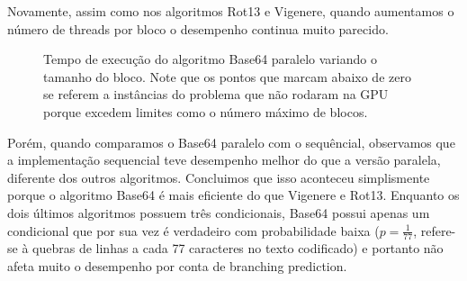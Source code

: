 \documentclass[12pt]{article}
\begin{document}
Novamente, assim como nos algoritmos Rot13 e Vigenere, quando aumentamos
o número de threads por bloco o desempenho continua muito parecido.

\begin{figure}[H]
    \caption{Tempo de execução do algoritmo Base64 paralelo variando o
    tamanho do bloco. Note que os pontos que marcam abaixo de zero se
    referem a instâncias do problema que não rodaram na GPU porque 
    excedem limites como o número máximo de blocos.}
\end{figure}

Porém, quando comparamos o Base64 paralelo com o sequêncial, observamos
que a implementação sequencial teve desempenho melhor do que a versão
paralela, diferente dos outros algoritmos. Concluimos que isso aconteceu
simplismente porque o algoritmo Base64 é mais eficiente do que Vigenere 
e Rot13. Enquanto os dois últimos algoritmos possuem três condicionais, 
Base64 possui apenas um condicional que por sua vez é verdadeiro com 
probabilidade baixa ($p = \frac{1}{77}$, refere-se à quebras de linhas a
cada 77 caracteres no texto codificado) e portanto não afeta muito o 
desempenho por conta de branching prediction.
\end{document}
